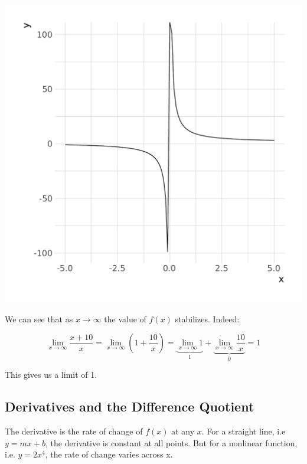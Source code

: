 \begin{center}
    \includegraphics[scale = 0.55]{figures/limit.pdf}    
\end{center}

\noindent We can see that as $x \rightarrow \infty$ the value of $f(x)$ stabilizes. Indeed:

\begin{equation*}
    \lim_{x \rightarrow \infty} \frac{x + 10}{x} = 
    \lim_{x \rightarrow \infty} \left(1 + \frac{10}{x}\right) = 
    \underbrace{\lim_{x \rightarrow \infty} 1}_1 + \underbrace{\lim_{x \rightarrow \infty} \frac{10}{x}}_0 = 1
\end{equation*}

\noindent This gives us a limit of 1.

\subsection{Derivatives and the Difference Quotient}

The derivative is the rate of change of $f(x)$ at any $x$. For a straight line, i.e $y = mx + b$, the derivative is constant at all points. But for a nonlinear function, i.e. $y = 2x^4$, the rate of change varies across x.

